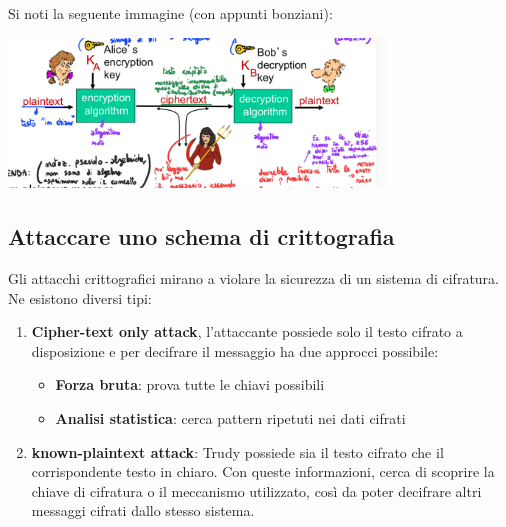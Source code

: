 Si noti la seguente immagine (con appunti bonziani):
\begin{center}
    \includegraphics[width=10cm]{img/crittografia.png}
\end{center}

\subsection{Attaccare uno schema di crittografia}

Gli attacchi crittografici mirano a violare la sicurezza di un sistema di cifratura. Ne esistono diversi tipi:
\begin{enumerate}
    \item \textbf{Cipher-text only attack}, l'attaccante possiede solo il testo cifrato a disposizione e per decifrare il messaggio ha due approcci possibile:
    \begin{itemize}
        \item \textbf{Forza bruta}: prova tutte le chiavi possibili
        \item \textbf{Analisi statistica}: cerca pattern ripetuti nei dati cifrati
    \end{itemize}
    \item \textbf{known-plaintext attack}: Trudy possiede sia il testo cifrato che il corrispondente testo in chiaro. Con queste informazioni, cerca di scoprire la chiave di cifratura o il meccanismo utilizzato, così da poter decifrare altri messaggi cifrati dallo stesso sistema.
    
    
\end{enumerate}

